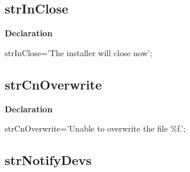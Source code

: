 \documentclass{report}
\newif\ifpdf
\begin{document}
\subsection*{strInClose}
\fi
\label{trstrings-strInClose}
\begin{list}{}{
\setlength{\itemindent}{0cm}
\setlength{\listparindent}{0cm}
\setlength{\leftmargin}{\evensidemargin}
\addtolength{\leftmargin}{\tmplength}
\settowidth{\labelsep}{X}
\addtolength{\leftmargin}{\labelsep}
\setlength{\labelwidth}{\tmplength}
}
\item[\textbf{Declaration}\hfill]
\ifpdf
\begin{flushleft}
\fi
\begin{ttfamily}
strInClose='The installer will close now';\end{ttfamily}

\ifpdf
\end{flushleft}
\fi

\end{list}
\ifpdf
\subsection*{\large{\textbf{strCnOverwrite}}\normalsize\hspace{1ex}\hrulefill}
\else
\subsection*{strCnOverwrite}
\fi
\label{trstrings-strCnOverwrite}
\begin{list}{}{
\setlength{\itemindent}{0cm}
\setlength{\listparindent}{0cm}
\setlength{\leftmargin}{\evensidemargin}
\addtolength{\leftmargin}{\tmplength}
\settowidth{\labelsep}{X}
\addtolength{\leftmargin}{\labelsep}
\setlength{\labelwidth}{\tmplength}
}
\item[\textbf{Declaration}\hfill]
\ifpdf
\begin{flushleft}
\fi
\begin{ttfamily}
strCnOverwrite='Unable to overwrite the file {\%}f.';\end{ttfamily}

\ifpdf
\end{flushleft}
\fi

\end{list}
\ifpdf
\subsection*{\large{\textbf{strNotifyDevs}}\normalsize\hspace{1ex}\hrulefill}
\else
\end{document}

